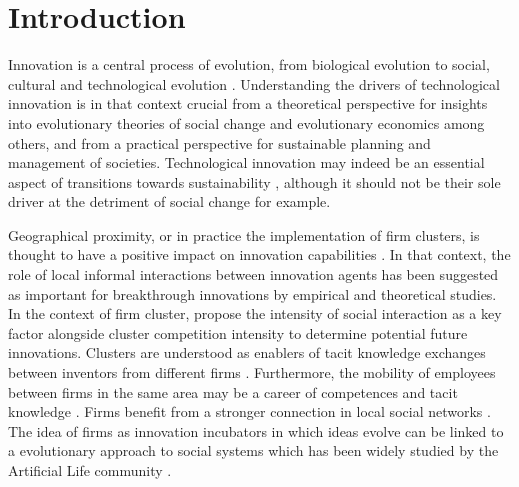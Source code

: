 \documentclass[letterpaper]{article}
\begin{document}


\section{Introduction}

Innovation is a central process of evolution, from biological evolution to social, cultural \citep{mesoudi2018cumulative} and technological evolution \citep{sood2005technological}. Understanding the drivers of technological innovation is in that context crucial from a theoretical perspective for insights into evolutionary theories of social change and evolutionary economics among others, and from a practical perspective for sustainable planning and management of societies. Technological innovation may indeed be an essential aspect of transitions towards sustainability \citep{adams2016sustainability}, although it should not be their sole driver at the detriment of social change for example.

Geographical proximity, or in practice the implementation of firm clusters, is thought to have a positive impact on innovation capabilities \citep{bittencourt2019cluster}. In that context, the role of local informal interactions between innovation agents has been suggested as important for breakthrough innovations by empirical and theoretical studies. In the context of firm cluster, \cite{gnyawali2013complementary} propose the intensity of social interaction as a key factor alongside cluster competition intensity to determine potential future innovations. Clusters are understood as enablers of tacit knowledge exchanges between inventors from different firms \citep{arikan2009interfirm}. Furthermore, the mobility of employees between firms in the same area may be a career of competences and tacit knowledge \citep{almeida1999localization}. Firms benefit from a stronger connection in local social networks \citep{kemeny2016economic}. The idea of firms as innovation incubators in which ideas evolve can be linked to a evolutionary approach to social systems which has been widely studied by the Artificial Life community \citep{marriott2018social}.
\end{document}
